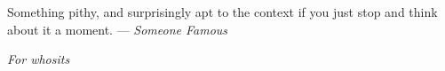 \thispagestyle{empty}
{}

\vspace*{3cm}

\begin{center}
    Something pithy, and surprisingly apt to the context if you just stop and think about it a moment.
    \medskip
    \hfill--- \emph{Someone Famous}
\end{center}

\vspace{13em}

\begin{center}
    \emph{For whosits}
\end{center}
